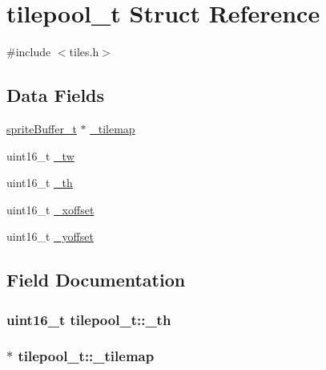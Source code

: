 \hypertarget{structtilepool__t}{}\section{tilepool\+\_\+t Struct Reference}
\label{structtilepool__t}


{\ttfamily \#include $<$tiles.\+h$>$}

\subsection*{Data Fields}
\begin{DoxyCompactItemize}
\item 
\hyperlink{structsprite_buffer__t}{sprite\+Buffer\+\_\+t} $\ast$ \hyperlink{structtilepool__t_a2bb67a7343217713e040b5b226b7dd32}{\+\_\+tilemap}
\item 
uint16\+\_\+t \hyperlink{structtilepool__t_af3e69db6b6fc3ea8a1cfbe57a7f03331}{\+\_\+tw}
\item 
uint16\+\_\+t \hyperlink{structtilepool__t_a93705a60174f75c507a2168ddae2f45e}{\+\_\+th}
\item 
uint16\+\_\+t \hyperlink{structtilepool__t_aa13b342aa0f301e0d9b160e17a1e23d8}{\+\_\+xoffset}
\item 
uint16\+\_\+t \hyperlink{structtilepool__t_a3d49b78c34fd815960055061dc4e3086}{\+\_\+yoffset}
\end{DoxyCompactItemize}


\subsection{Field Documentation}
\subsubsection[{\texorpdfstring{\+\_\+th}{\_th}}]{\setlength{\rightskip}{0pt plus 5cm}uint16\+\_\+t tilepool\+\_\+t\+::\+\_\+th}\hypertarget{structtilepool__t_a93705a60174f75c507a2168ddae2f45e}{}\label{structtilepool__t_a93705a60174f75c507a2168ddae2f45e}
\subsubsection[{\texorpdfstring{\+\_\+tilemap}{\_tilemap}}]{$\ast$ tilepool\+\_\+t\+::\+\_\+tilemap}\hypertarget{structtilepool__t_a2bb67a7343217713e040b5b226b7dd32}{}\label{structtilepool__t_a2bb67a7343217713e040b5b226b7dd32}
